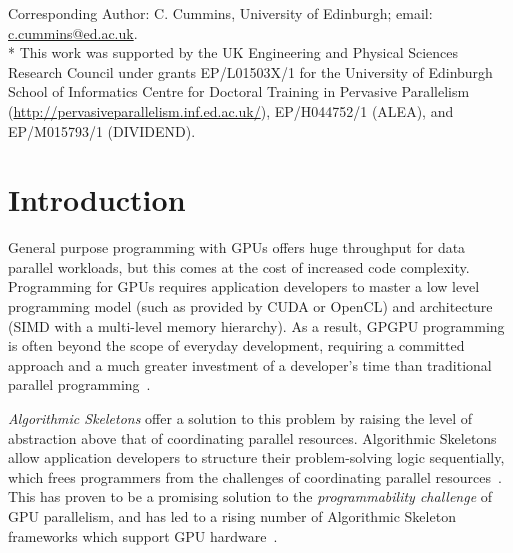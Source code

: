 

  \begin{bottomstuff}
    Corresponding Author: C. Cummins, University of Edinburgh;
    email: \url{c.cummins@ed.ac.uk}.\\*
    This work was supported by the UK Engineering and Physical Sciences
    Research Council under grants EP/L01503X/1 for the University of
    Edinburgh School of Informatics Centre for Doctoral Training in
    Pervasive Parallelism
    (\url{http://pervasiveparallelism.inf.ed.ac.uk/}), EP/H044752/1
    (ALEA), and EP/M015793/1 (DIVIDEND).
  \end{bottomstuff}

  \maketitle


  \section{Introduction}\label{sec:introduction}

  General purpose programming with GPUs offers huge throughput for data parallel workloads, but this comes at the cost of increased code complexity. Programming for GPUs requires application developers to master a low level programming model (such as provided by CUDA or OpenCL) and architecture (SIMD with a multi-level memory hierarchy). As a result, GPGPU programming is often beyond the scope of everyday development, requiring a committed approach and a much greater investment of a developer's time than traditional parallel programming~\cite{Fuller2011}.

  \textit{Algorithmic Skeletons} offer a solution to this problem by raising the level of abstraction above that of coordinating parallel resources. Algorithmic Skeletons allow application developers to structure their problem-solving logic sequentially, which frees programmers from the challenges of coordinating parallel resources~\cite{Cole2004,Gonzalez2010}. This has proven to be a promising solution to the \textit{programmability challenge} of GPU parallelism, and has led to a rising number of Algorithmic Skeleton frameworks which support GPU hardware~\cite{%
  Enmyren2010,%
  Ernsting2012,%
  Marques2013,%
  Steuwer2011,%
  Aldinucci2014%
  }.

